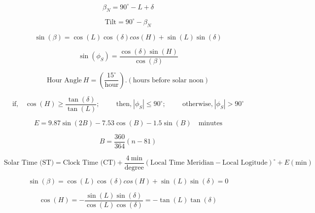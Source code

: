 \documentclass[12pt]{article}
\begin{document}
\begin{equation}
\label{altn}
\beta_{N}=90^{\circ}-L+\delta
\end{equation}

\begin{equation}
\label{tilt1}
\text{Tilt}=90^{\circ}-\beta_{N}
\end{equation}

\begin{equation}
\label{alt}
\sin{(\beta)}=\cos{(L)}\cos{(\delta)}cos{(H)}+\sin{(L)}\sin{(\delta)}
\end{equation}

\begin{equation}
\label{azm}
\sin{(\phi_{S})}=\frac{\cos{(\delta)}\sin{(H)}}{\cos{(\beta)}}
\end{equation}

\begin{equation}
\label{ha}
\text{Hour Angle}\ H=\left(\frac{15^{\circ}}{\text{hour}}\right).(\text{hours before solar noon})
\end{equation}

\begin{equation}
\label{hac}
\text{if,} \quad \cos{(H)}\geq\frac{\tan{(\delta)}}{\tan{(L)}}; \hspace{1cm} \text{then,} \ |\phi_{S}|\leq90^{\circ}; \hspace{1cm} \text{otherwise,} \ |\phi_{S}|>90^{\circ}
\end{equation}

\begin{equation}
\label{eot}
E= 9.87\sin{(2B)} -7.53\cos{(B)} -1.5\sin{(B)} \quad \text{minutes}
\end{equation}

\begin{equation}
\label{eotb}
B=\frac{360}{364}(n-81)
\end{equation}

\begin{equation}
\label{solartime}
\text{Solar Time (ST)}= \text{Clock Time (CT)}+ \frac{4 \ \text{min}}{\text{degree}}(\text{Local Time Meridian}- \text{Local Logitude})^{\circ} + E(\text{min})
\end{equation}

\begin{equation}
\label{sunrise1}
\sin{(\beta)}=\cos{(L)}\cos{(\delta)}cos{(H)}+\sin{(L)}\sin{(\delta)}=0
\end{equation}

\begin{equation}
\label{sunrise2}
\cos{(H)}=-\frac{\sin{(L)}\sin{(\delta)}}{\cos{(L)}\cos{(\delta)}}=-\tan{(L)}\tan{(\delta)}
\end{equation}
\end{document}
